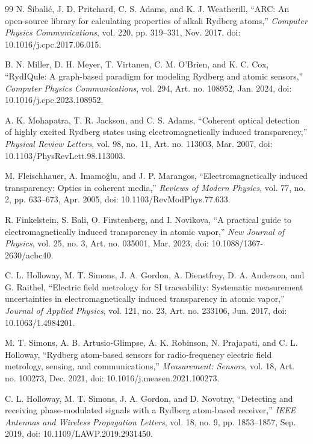 \documentclass{ieeeaccess}
\begin{document}
\begin{thebibliography}{99}
N. {\v{S}}ibali{\'c}, J. D. Pritchard, C. S. Adams, and K. J. Weatherill, ``ARC: An open-source library for calculating properties of alkali Rydberg atoms,'' \emph{Computer Physics Communications}, vol. 220, pp. 319--331, Nov. 2017, doi: 10.1016/j.cpc.2017.06.015.

B. N. Miller, D. H. Meyer, T. Virtanen, C. M. O'Brien, and K. C. Cox, ``RydIQule: A graph-based paradigm for modeling Rydberg and atomic sensors,'' \emph{Computer Physics Communications}, vol. 294, Art. no. 108952, Jan. 2024, doi: 10.1016/j.cpc.2023.108952.

A. K. Mohapatra, T. R. Jackson, and C. S. Adams, ``Coherent optical detection of highly excited Rydberg states using electromagnetically induced transparency,'' \emph{Physical Review Letters}, vol. 98, no. 11, Art. no. 113003, Mar. 2007, doi: 10.1103/PhysRevLett.98.113003.

M. Fleischhauer, A. Imamo\u{g}lu, and J. P. Marangos, ``Electromagnetically induced transparency: Optics in coherent media,'' \emph{Reviews of Modern Physics}, vol. 77, no. 2, pp. 633--673, Apr. 2005, doi: 10.1103/RevModPhys.77.633.

R. Finkelstein, S. Bali, O. Firstenberg, and I. Novikova, ``A practical guide to electromagnetically induced transparency in atomic vapor,'' \emph{New Journal of Physics}, vol. 25, no. 3, Art. no. 035001, Mar. 2023, doi: 10.1088/1367-2630/acbc40.

C. L. Holloway, M. T. Simons, J. A. Gordon, A. Dienstfrey, D. A. Anderson, and G. Raithel, ``Electric field metrology for SI traceability: Systematic measurement uncertainties in electromagnetically induced transparency in atomic vapor,'' \emph{Journal of Applied Physics}, vol. 121, no. 23, Art. no. 233106, Jun. 2017, doi: 10.1063/1.4984201.

M. T. Simons, A. B. Artusio-Glimpse, A. K. Robinson, N. Prajapati, and C. L. Holloway, ``Rydberg atom-based sensors for radio-frequency electric field metrology, sensing, and communications,'' \emph{Measurement: Sensors}, vol. 18, Art. no. 100273, Dec. 2021, doi: 10.1016/j.measen.2021.100273.

C. L. Holloway, M. T. Simons, J. A. Gordon, and D. Novotny, ``Detecting and receiving phase-modulated signals with a Rydberg atom-based receiver,'' \emph{IEEE Antennas and Wireless Propagation Letters}, vol. 18, no. 9, pp. 1853--1857, Sep. 2019, doi: 10.1109/LAWP.2019.2931450.


\end{thebibliography}
\end{document}
